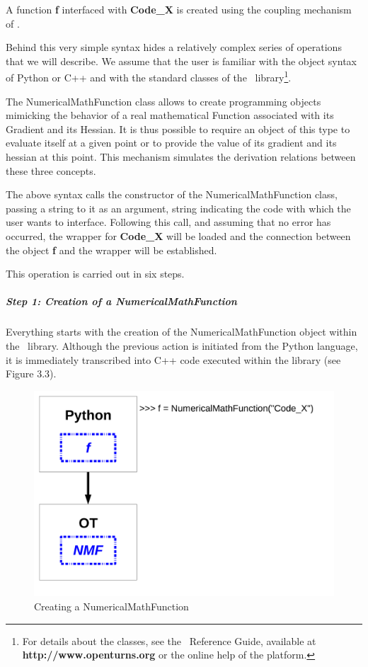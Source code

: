 A function {\bf f} interfaced with {\bf Code\_X} is created using the coupling mechanism of \OT.

Behind this very simple syntax hides a relatively complex series of operations that we will describe. We assume that the user is familiar with the object syntax of Python or C++ and with the standard classes of the \OT\ library\footnote{For details about the classes, see the \OT\ Reference Guide, available at {\bf http://www.openturns.org} or the online help of the platform.}.

The NumericalMathFunction class allows to create programming objects mimicking the behavior of a real mathematical Function associated with its Gradient and its Hessian. It is thus possible to require an object of this type to evaluate itself at a given point or to provide the value of its gradient and its hessian at this point. This mechanism simulates the derivation relations between these three concepts.

The above syntax calls the constructor of the NumericalMathFunction class, passing a string to it as an argument, string indicating the code with which the user wants to interface. Following this call, and assuming that no error has occurred, the wrapper for {\bf Code\_X} will be loaded and the connection between the object {\bf f} and the wrapper will be established.

This operation is carried out in six steps.

\subparagraph{Step 1: Creation of a NumericalMathFunction}

Everything starts with the creation of the NumericalMathFunction object within the \OT\ library. Although the previous action is initiated from the Python language, it is immediately transcribed into C++ code executed within the library (see Figure 3.3).

\begin{figure}
\begin{center}
\includegraphics[width=12cm]{Figures/wrapper/Figure3.pdf}
\caption[Figure 3]{Creating a NumericalMathFunction}
\end{center}
\end{figure}

